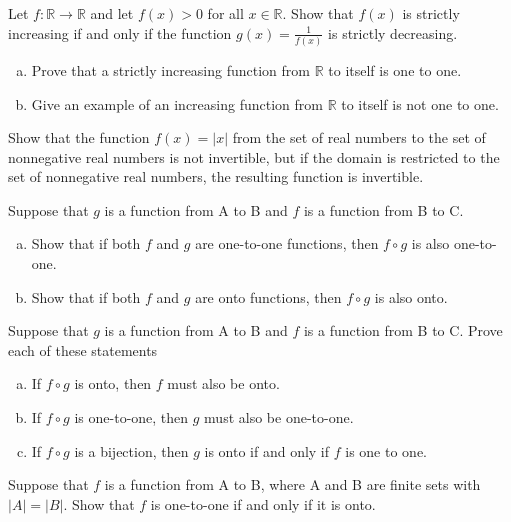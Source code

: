 \documentclass{article}
\newenvironment{problem}[2][Problem]{\begin{trivlist}
\item[\hskip \labelsep {\bfseries #1}\hskip \labelsep {\bfseries #2.}]}{\end{trivlist}}
\begin{document}
\begin{problem}{5}[Chapter 2.3, Question 24]
Let $ f: \mathbb{R} \rightarrow \mathbb{R}$ and let $ f(x) > 0 $ for all $ x \in \mathbb{R}$. Show that $f(x)$ is strictly increasing if and only if the function $g(x) = \frac{1}{f(x)}$ is strictly decreasing. 
\end{problem}


\begin{problem}{6}[Chapter 2.3, Question 26]
\begin{enumerate}[(a)]
    \item Prove that a strictly increasing function from $\mathbb{R}$ to itself is one to one.
    \item Give an example of an increasing function from $\mathbb{R}$ to itself is not one to one.
\end{enumerate}
\end{problem}


\begin{problem}{7}[Chapter 2.3, Question 29]
Show that the function $f(x) = \lvert x \rvert$ from the set of real numbers to the set of nonnegative real numbers is not invertible, but if the domain
is restricted to the set of nonnegative real numbers, the resulting function is invertible.

\end{problem}
\begin{problem}{8}[Chapter 2.3, Question 33]
Suppose that $g$ is a function from A to B and $f$ is a function from B to C.
\begin{enumerate}[(a)]
    \item Show that if both $f$ and $g$ are one-to-one functions,
    then $f \circ g$ is also one-to-one.
    \item Show that if both $f$ and $g$ are onto functions, then $f \circ g$
    is also onto.
\end{enumerate}    
    
\end{problem}
\begin{problem}{9}[Chapter 2.3, Question 34]
Suppose that $g$ is a function from A to B and $f$ is a function from B to C. Prove each of these statements
    \begin{enumerate}[(a)]
        \item If $f \circ g$ is onto, then $f$ must also be onto.
        \item If $f \circ g$ is one-to-one, then $g$ must also be one-to-one.
        \item If $f \circ g$ is a bijection, then $g$ is onto if and only if $f$ is one to one. 
    \end{enumerate}    
        
\end{problem}
\begin{problem}{10}[Chapter 2.3, Question 74]
    Suppose that $f$ is a function from A to B, where A and B
    are finite sets with $ \lvert A \rvert =  \lvert B \rvert$. Show that $f$ is one-to-one if
    and only if it is onto.
\end{problem}
\end{document}
